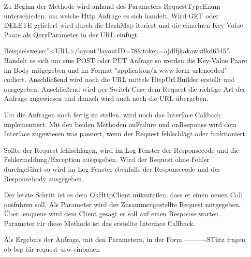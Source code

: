 Zu Beginn der Methode wird anhand des Parameters RequestTypeEnum unterschieden, um welche Http Anfrage es sich handelt. Wird GET oder DELETE geliefert wird durch die HashMap iteriert und die einzelnen Key-Value Paare als QeryParameter in der URL einfügt.

Beispielsweise:''<URL>/layout?layoutID=78&token=ajdlfjkakawkflkd6545''.
Handelt es sich um eine POST oder PUT Anfrage so werden die Key-Value Paare im Body mitgegeben und im Format "application/x-www-form-urlencoded" codiert. Anschließend wird noch die URL mittels HttpUrl.Builder erstellt und ausgegeben. 
Anschließend wird per Switch-Case dem Request die richtige Art der Anfrage zugewiesen und danach wird auch noch die URL übergeben. 

Um die Anfragen noch fertig zu stellen, wird noch das Interface Callback implementiert. Mit den beiden Methoden onFailure und onResponse wird dem Interface zugewiesen was passiert, wenn der Request fehlschlägt oder funktioniert. 

Sollte der Request fehlschlagen, wird im Log-Fenster der Responsecode und die Fehlermeldung/Exception ausgegeben. 
Wird der Request ohne Fehler durchgeführt so wird im Log-Fenster ebenfalls der Responsecode und der Responsebody ausgegeben.

Der letzte Schritt ist es dem OkHttpClient mitzuteilen, dass er einen neuen Call ausführen soll. Als Parameter wird der Zusammengestellte Request mitgegeben. Über .enqueue wird dem Client gesagt er soll auf einen Response warten. Parameter für diese Methode ist das erstellte Interface Callback.






Als Ergebnis der Anfrage, mit den Parametern, in der Form
----------STütz fragen ob bsp für request usw einbauen



